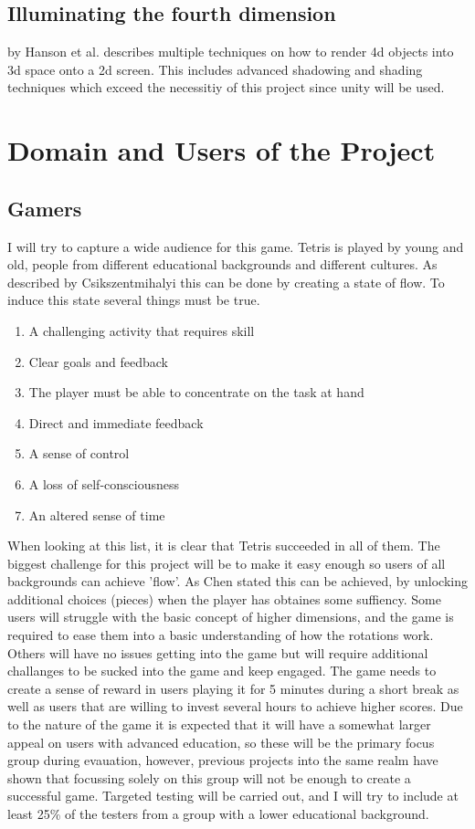 \documentclass{article}
\begin{document}
\subsection{Illuminating the fourth dimension} by Hanson et al. \cite{4d_vis_3} describes multiple techniques on how to render 4d objects into 3d space onto a 2d screen. This includes advanced shadowing and shading techniques which exceed the necessitiy of this project since unity will be used.
\newpage



\section{Domain and Users of the Project}
\subsection{Gamers}
I will try to capture a wide audience for this game. 
Tetris is played by young and old, people from different educational backgrounds and different cultures.
As described by Csikszentmihalyi \cite{flow} this can be done by creating a state of flow. To induce this state several things must be true.
\begin{enumerate}
    \item A challenging activity that requires skill
    \item Clear goals and feedback
    \item The player must be able to concentrate on the task at hand
    \item Direct and immediate feedback
    \item A sense of control
    \item A loss of self-consciousness
    \item An altered sense of time
\end{enumerate}
When looking at this list, it is clear that Tetris succeeded in all of them. The biggest challenge for this project will be to make it easy enough so users of all backgrounds can achieve 'flow'. As Chen \cite{flow_2} stated this can be achieved, by unlocking additional choices (pieces) when the player has obtaines some suffiency. Some users will struggle with the basic concept of higher dimensions, and the game is required to ease them into a basic understanding of how the rotations work. Others will have no issues getting into the game but will require additional challanges to be sucked into the game and keep engaged. The game needs to create a sense of reward in users playing it for 5 minutes during a short break as well as users that are willing to invest several hours to achieve higher scores. Due to the nature of the game it is expected that it will have a somewhat larger appeal on users with advanced education, so these will be the primary focus group during evauation, however, previous projects into the same realm have shown that focussing solely on this group will not be enough to create a successful game. Targeted testing will be carried out, and I will try to include at least 25\% of the testers from a group with a lower educational background.
\end{document}
